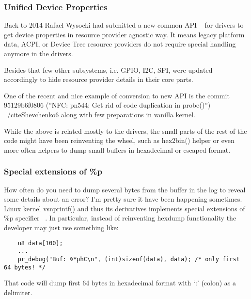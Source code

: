 \documentclass[10pt, a5paper]{article}
\begin{document}
\subsubsection*{Unified Device Properties}

Back to 2014 Rafael Wysocki had submitted a new common API ~\cite{Shevchenko4} for drivers to get device properties in resource provider agnostic way. It means legacy platform data, ACPI, or Device Tree resource providers do not require special handling anymore in the drivers.

Besides that few other subsystems, i.e. GPIO, I2C, SPI, were updated accordingly to hide resource provider details in their core parts.

One of the recent and nice example of conversion to new API is the commit 95129b6f0806 (''NFC: pn544: Get rid of code duplication in probe()'') ~/cite{Shevchenko6} along with few preparations in vanilla kernel.

While the above is related mostly to the drivers, the small parts of the rest of the code might have been reinventing the wheel, such as hex2bin() helper or even more often helpers to dump small buffers in hexadecimal or escaped format.

\subsubsection*{Special extensions of \%p}

How often do you need to dump several bytes from the buffer in the log to reveal some details about an error? I’m pretty sure it have been happening sometimes. Linux kernel vsnprintf() and thus its derivatives implements special extensions of \%p specifier ~\cite{Shevchenko7}. In particular, instead of reinventing hexdump functionality the developer may just use something like:

\lstset{ %
language=C,                 %
basicstyle=\small\sffamily, %
breaklines=true,           %
breakatwhitespace=false, %
}
\begin{lstlisting}
    u8 data[100};
    ...
    pr_debug("Buf: %*phC\n", (int)sizeof(data), data); /* only first 64 bytes! */
\end{lstlisting}

That code will dump first 64 bytes in hexadecimal format with ‘:’ (colon) as a delimiter.
\end{document}
